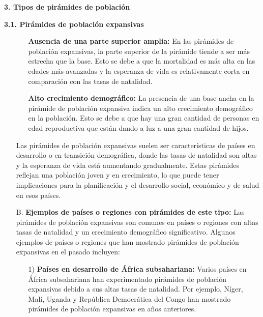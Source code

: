 \documentclass[8pt,a4paper]{beamer}
\begin{document}
{\begin{frame}{\textbf{3. Tipos de pirámides de población}}
\begin{block}{\textbf{3.1. Pirámides de población expansivas}}
\begin{enumerate}
\end{enumerate}
\end{block}
\end{frame}

\begin{frame}{}
\begin{block}{}
\begin{enumerate}
\justifying
\item[{}] 
\begin{itemize}
\justifying
\item[\ding{65}] \textbf{Ausencia de una parte superior amplia:} En las pirámides de población expansivas, la parte superior de la pirámide tiende a ser más estrecha que la base. Esto se debe a que la mortalidad es más alta en las edades más avanzadas y la esperanza de vida es relativamente corta en comparación con las tasas de natalidad.

\item[\ding{65}] \textbf{Alto crecimiento demográfico:} La presencia de una base ancha en la pirámide de población expansiva indica un alto crecimiento demográfico en la población. Esto se debe a que hay una gran cantidad de personas en edad reproductiva que están dando a luz a una gran cantidad de hijos.
\end{itemize}
Las pirámides de población expansivas suelen ser características de países en desarrollo o en transición demográfica, donde las tasas de natalidad son altas y la esperanza de vida está aumentando gradualmente. Estas pirámides reflejan una población joven y en crecimiento, lo que puede tener implicaciones para la planificación y el desarrollo social, económico y de salud en esos países.
\item[B.] \textbf{Ejemplos de países o regiones con pirámides de este tipo:} Las pirámides de población expansivas son comunes en países o regiones con altas tasas de natalidad y un crecimiento demográfico significativo. Algunos ejemplos de países o regiones que han mostrado pirámides de población expansivas en el pasado incluyen:
\end{enumerate}
\end{block}
\end{frame}

\begin{frame}{}
\begin{block}{}
\justifying
\begin{enumerate}
\justifying
\item[{}]
\begin{enumerate}
\justifying
\item[1)] \textbf{Países en desarrollo de África subsahariana:} Varios países en África subsahariana han experimentado pirámides de población expansivas debido a sus altas tasas de natalidad. Por ejemplo, Níger, Malí, Uganda y República Democrática del Congo han mostrado pirámides de población expansivas en años anteriores.


\end{enumerate}
\end{enumerate}
\end{block}
\end{frame}}
\end{document}
